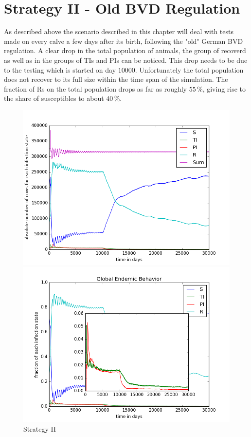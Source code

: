\section{Strategy II - Old BVD Regulation}
As described above the scenario described in this chapter will deal with tests made on every calve a few days after its birth, following the "old" German BVD regulation. A clear drop in the total population of animals, the group of recoverd as well as in the groups of TIs and PIs can be noticed. This drop needs to be due to the testing which is started on day $10000$. Unfortunately the total population does not recover to its full size within the time span of the simulation. The fraction of Rs on the total population drops as far as roughly $55\,\%$, giving rise to the share of susceptibles to about $40\,\%$.
\begin{figure}[htbp]
\begin{minipage}{0.5\textwidth}
\centering
\noindent\includegraphics[width=0.95\linewidth,height=\textheight,
keepaspectratio]{cont2totalEndemicNumbers.png} 
\end{minipage}
\begin{minipage}{0.5\textwidth}
\centering
\noindent\includegraphics[width=0.95\linewidth,height=\textheight,
keepaspectratio]{cont2endemicFractions.png} 
\end{minipage}
\caption[Endemic Behavior in Containment Strategy Two]{Strategy II}
\label{fig:demographyScen8}
\end{figure}
